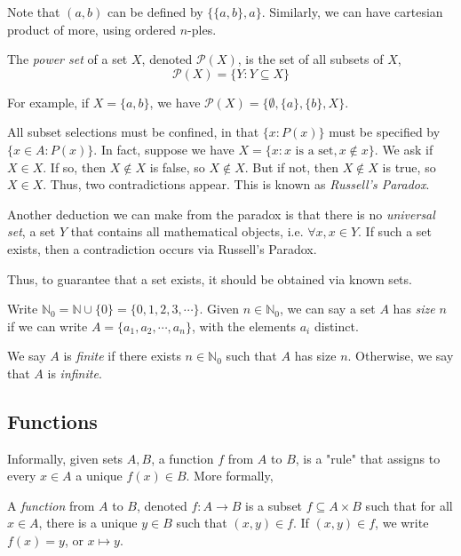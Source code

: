 \documentclass[12pt]{article}
\begin{document}
Note that $(a,b)$ can be defined by $\{\{a,b\},a\}$. 
Similarly, we can have cartesian product of more, using ordered $n$-ples.

\begin{definition}
    The \emph{power set} of a set $X$, denoted $\mathcal{P}(X)$,
    is the set of all subsets of $X$,
    \[
    \mathcal{P}(X) = \{Y : Y \subseteq X\}
    \]
\end{definition}
For example, if $X=\{a,b\}$, we have $\mathcal{P}(X) = \{\emptyset,\{a\},\{b\},X\}$.

All subset selections must be confined, in that
$\{x : P(x)\}$ must be specified by $\{x \in A : P(x)\}$.
In fact, suppose we have $X=\{x : x\text{ is a set}, x \notin x\}$.
We ask if $X \in X$. If so, then $X \notin X$ is false,
so $X \notin X$. But if not, then $X \notin X$ is true,
so $X \in X$. Thus, two contradictions appear.
This is known as \emph{Russell's Paradox}.

Another deduction we can make from the paradox is that
there is no \emph{universal set}, a set $Y$ that contains
all mathematical objects, i.e. $\forall x, x \in Y$.
If such a set exists, then a contradiction occurs
via Russell's Paradox.

Thus, to guarantee that a set exists,
it should be obtained via known sets.

\begin{definition}
    Write $\mathbb{N}_{0} = \mathbb{N} \cup \{0\} = \{0,1,2,3,\cdots\}$.
    Given $n \in \mathbb{N}_{0}$, we can say a set $A$
    has \emph{size} $n$ if we can write $A = \{a_{1},a_{2},\cdots,a_n\}$,
    with the elements $a_i$ distinct.
\end{definition}

\begin{definition}
    We say $A$ is \emph{finite} if there exists $n \in \mathbb{N}_{0}$
    such that $A$ has size $n$.
    Otherwise, we say that $A$ is \emph{infinite}.
\end{definition}

\subsection{Functions}

Informally, given sets $A,B$, a function $f$ from $A$ to $B$,
is a "rule" that assigns to every $x \in A$ a unique $f(x) \in B$.
More formally,

\begin{definition}
    A \emph{function} from $A$ to $B$, denoted $f: A \to B$ is a subset $f \subseteq A \times B$
    such that for all $x \in A$, 
    there is a unique $y \in B$ such that $(x, y) \in f$.
    If $(x,y) \in f$, we write $f(x) = y$, or $x \mapsto y$.
\end{definition}
\end{document}

